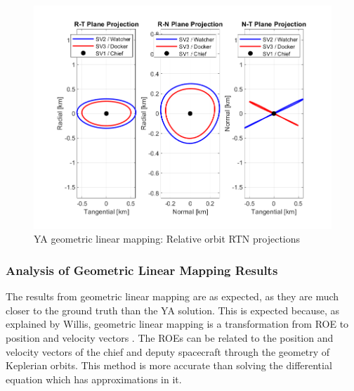 \begin{figure}[H]
    \centering
    \includegraphics[width=0.7\linewidth]{sim/figures/PS3/RTN_projections_YA_mapping.png}
    \caption{YA geometric linear mapping: Relative orbit RTN projections}
    \label{fig:YA_map_RTN}
\end{figure}

\subsubsection{Analysis of Geometric Linear Mapping Results}\label{sec:geom_mapping_analysis}
The results from geometric linear mapping are as expected, as they are much closer to the ground truth than the YA solution. This is expected because, as explained by Willis, geometric linear mapping is a transformation from ROE to position and velocity vectors \cite{willis2023analytical}. The ROEs can be related to the position and velocity vectors of the chief and deputy spacecraft through the geometry of Keplerian orbits. This method is more accurate than solving the differential equation which has approximations in it. 

